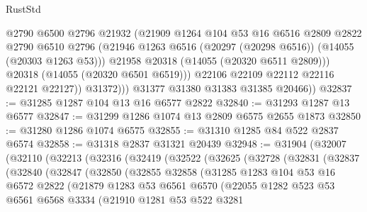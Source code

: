 \begin{lexlean}{RustStd}
\begin{coremodule}
                    @2790
                    @6500
                    @2796
                    @21932
                    (@21909
                      @1264
                      @104
                      @53
                      @16
                      @6516
                      @2809
                      @2822
                      @2790
                      @6510
                      @2796
                      (@21946 @1263 @6516 (@20297 (@20298 @6516)) (@14055 (@20303 @1263 @53)))
                      @21958
                      @20318
                      (@14055 (@20320 @6511 @2809)))
                    @20318
                    (@14055 (@20320 @6501 @6519)))
                  @22106
                  @22109
                  @22112
                  @22116
                  @22121
                  @22127))
              @31372)))
        @31377
        @31380
        @31383
        @31385
        @20466))
@32837 := @31285 @1287 @104 @13 @16 @6577 @2822
@32840 := @31293 @1287 @13 @6577
@32847 := @31299 @1286 @1074 @13 @2809 @6575 @2655 @1873
@32850 := @31280 @1286 @1074 @6575
@32855 := @31310 @1285 @84 @522 @2837 @6574
@32858 := @31318 @2837 @31321 @20439
@32948 := @31904
    (@32007
      (@32110
        (@32213
          (@32316
            (@32419
              (@32522
                (@32625
                  (@32728
                    (@32831
                      (@32837
                        (@32840
                          (@32847
                            (@32850
                              (@32855
                                @32858
                                (@31285
                                  @1283
                                  @104
                                  @53
                                  @16
                                  @6572
                                  @2822
                                  (@21879
                                    @1283
                                    @53
                                    @6561
                                    @6570
                                    (@22055
                                      @1282
                                      @523
                                      @53
                                      @6561
                                      @6568
                                      @3334
                                      (@21910
                                        @1281
                                        @53
                                        @522
                                        @3281

\end{coremodule}
\end{lexlean}
